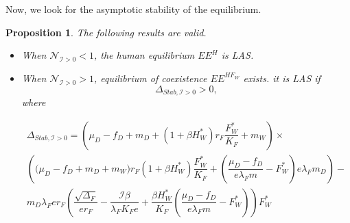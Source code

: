 \documentclass{article}
\newcommand{\lfw}{\lambda_{F}}
\newcommand{\lfw}{\lambda_{F}}
\newcommand{\cI}{\mathcal{I}}
\newtheorem{prop}{Proposition}
\begin{document}
Now, we look for the asymptotic stability of the equilibrium.

\begin{prop}\label{propLAS} The following results are valid.
\begin{itemize}
\item When $\mathcal{N}_{\cI > 0} < 1$, the human equilibrium $EE^{H}$ is LAS.
\item When $\mathcal{N}_{\cI > 0} > 1$, equilibrium of coexistence $EE^{HF_W}$  exists. it is LAS if 
$$\Delta_{Stab, \cI > 0} > 0,$$  where 

\begin{multline*}
\Delta_{Stab, \cI > 0} = \left(\mu_D -f_D + m_D + (1+\beta H_W^*)r_F \dfrac{F_W^*}{K_F} + m_W  \right) \times \\ \left(\big( \mu_D  -f_D + m_D + m_W) r_F(1+ \beta H_W^*) \dfrac{F^*_W}{K_F} + \left(\dfrac{\mu_D -f_D}{e\lfw m} - F_W^*\right) e \lfw m_D \right) - \\m_D \lfw e r_F \left(\dfrac{\sqrt{\Delta_F}}{er_F} - \dfrac{\cI \beta}{\lfw K_F e} +  \dfrac{\beta H_W^*}{K_F} \left(\dfrac{\mu_D -f_D }{e \lfw m} - F_W^*\right)\right)  F^*_{W}
\end{multline*}
\end{itemize}
\end{prop}
\end{document}
